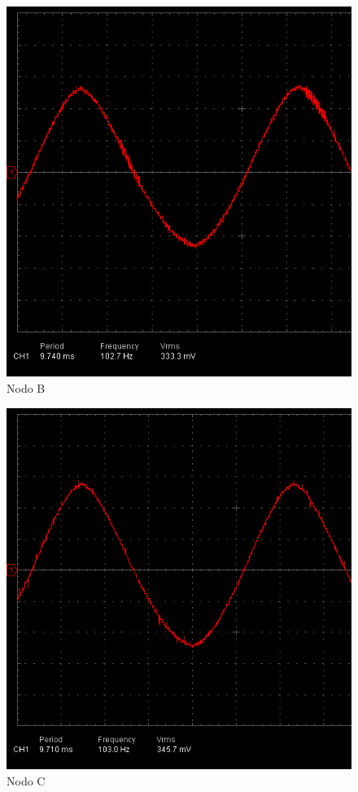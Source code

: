 \begin{figure}[H]
    \centering
    \includegraphics[scale=0.5]{img/Osci/Nodo B 100Hz.png}
    \caption{Nodo B}
    \label{Nodo B}
\end{figure}

\begin{figure}[H]
    \centering
    \includegraphics[scale=0.5]{img/Osci/Nodo C 100Hz.png}
    \caption{Nodo C}
    \label{Nodo C}
\end{figure}

